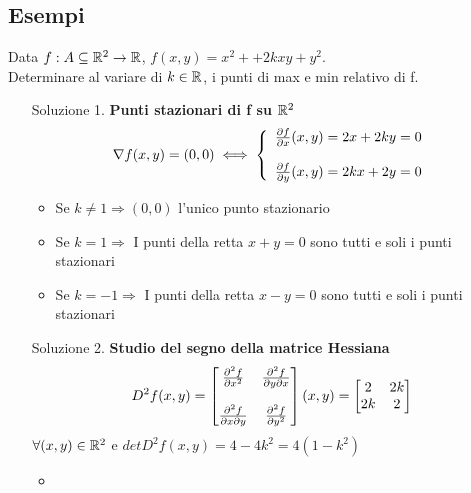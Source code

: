\subsection{Esempi}
\begin{example}[1a,foglio 5]
  Data $f: A \subseteq \mathbb{R}^2 \to \mathbb{R}$, $f(x,y) = x^2++2kxy+y^2$. \\
  Determinare al variare di $k \in \mathbb{R}$, i punti di max e min relativo di f.
  \begin{itemize}
    \item[Soluzione 1.] \textbf{Punti stazionari di f su $\mathbb{R}^2$}
          $$\nabla f(x,y) = (0,0) \iff \left\{\begin{array}{l}
            \frac{\partial f}{\partial x}(x,y) = 2x+2ky = 0 \\
            \\
            \frac{\partial f}{\partial y}(x,y) = 2kx+2y = 0 \\
          \end{array}\right.$$
          \begin{itemize}
            \item \begin{exercise}
                    Se $k\neq 1 \Rightarrow (0,0)$ \ace l'unico punto stazionario 
                  \end{exercise}
            \item Se $k = 1 \Rightarrow$ I punti della retta $x+y=0$ sono tutti e soli i punti stazionari
            \item Se $k = -1 \Rightarrow$ I punti della retta $x-y=0$ sono tutti e soli i punti stazionari 
          \end{itemize}
    \item[Soluzione 2.] \textbf{Studio del segno della matrice Hessiana}
          $$D^2f(x,y) = \begin{bmatrix}
            \frac{\partial^2 f}{\partial x^2} & \frac{\partial^2 f}{\partial y \partial x}  \\
            \\
            \frac{\partial^2 f}{\partial x \partial y} & \frac{\partial^2 f}{\partial y^2}  \\
          \end{bmatrix}(x,y) = \begin{bmatrix}
            2 & 2k \\
            2k & 2 \\
          \end{bmatrix}$$
          $\forall (x,y)\in \mathbb{R}^2$ e $detD^2f(x,y) = 4-4k^2 = 4(1-k^2)$
          \begin{itemize}
            \item \begin{exercise}

\end{exercise}
\end{itemize}
\end{itemize}
\end{example}
